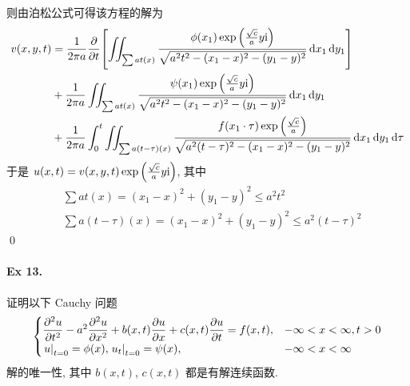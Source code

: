 \begin{solution}
则由泊松公式可得该方程的解为
\[ \begin{aligned}
v(x, y, t) &= \frac1{2\pi a} {{\frac{\partial {}}{\partial {t}}}} {\left[ {
    \iint_{\sum a t(x)} \frac{
        \phi(x_1) \exp{\left( {\frac{\sqrt{c}}{a}y{\mathrm i}} \right)}
    }{
        \sqrt{a^2 t^2 - (x_1 -x)^2 - (y_1 - y)^2}
    } \operatorname{d\!} x_1 \operatorname{d\!} y_1
} \right]} \\
&+ \frac1{2\pi a} \iint_{\sum a t(x)} \frac{
    \psi(x_1) \exp{\left( {\frac{\sqrt{c}}{a}y{\mathrm i}} \right)}
}{
    \sqrt{a^2 t^2 - (x_1 -x)^2 - (y_1 - y)^2}
} \operatorname{d\!} x_1 \operatorname{d\!} y_1 \\
&+ \frac1{2\pi a} \int_0^t \iint_{\sum a (t - \tau)(x)} \frac{
    f(x_1 \cdot \tau) \exp{\left( {\frac{\sqrt{c}}{a}} \right)}
}{
    \sqrt{a^2 (t-\tau)^2 - (x_1 -x)^2 - (y_1 - y)^2}
} \operatorname{d\!} x_1 \operatorname{d\!} y_1 \operatorname{d\!} \tau \\
\end{aligned} \]
于是 $u(x, t) = v(x, y, t) \exp{\left( {\frac{\sqrt{c}}{a}y{\mathrm i}} \right)}$, 其中
\[ \begin{aligned}
&\sum a t(x) = (x_1 -x)^2 + (y_1 - y)^2 \leq a^2 t^2 \\
&\sum a (t - \tau)(x) = (x_1 -x)^2 + (y_1 - y)^2 \leq a^2 (t - \tau)^2
\end{aligned} \]
\qed
\end{solution}


\paragraph{Ex 13.}
证明以下 Cauchy 问题
\[ \begin{cases}
\dfrac{\partial^2 u}{\partial t^2} - a^2 \dfrac{\partial^2 u}{\partial x^2}
 + b(x, t)\dfrac{\partial u}{\partial x} + c(x, t)\dfrac{\partial u}{\partial t}
 = f(x, t), & -\infty < x < \infty, t > 0 \\ 
{\left.{u} \right|}_{t=0} = \phi(x), {\left.{u_t} \right|}_{t=0} = \psi(x), & -\infty < x < \infty
\end{cases} \]
解的唯一性, 其中 $b(x, t)$, $c(x, t)$ 都是有解连续函数.


